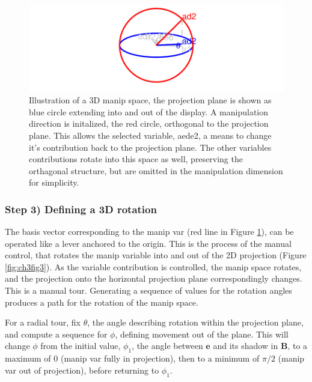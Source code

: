 \documentclass{monashthesis}
\begin{document}
\begin{figure}

{\centering \includegraphics[width=1\linewidth,]{./figures_from_script/ch3_fig2_manip_sp} 

}

\caption{Illustration of a 3D manip space, the projection plane is shown as blue circle extending into and out of the display. A manipulation direction is initalized, the red circle, orthogonal to the projection plane. This allows the selected variable, aede2, a means to change it's contribution back to the projection plane. The other variables contributions rotate into this space as well, preserving the orthagonal structure, but are omitted in the manipulation dimension for simplicity.}\label{fig:ch3fig2}
\end{figure}

\hypertarget{step-3-defining-a-3d-rotation}{%
\subsubsection{Step 3) Defining a 3D rotation}\label{step-3-defining-a-3d-rotation}}

The basis vector corresponding to the manip var (red line in Figure \ref{fig:ch3fig2}), can be operated like a lever anchored to the origin. This is the process of the manual control, that rotates the manip variable into and out of the 2D projection (Figure \ref{fig:ch3fig3}). As the variable contribution is controlled, the manip space rotates, and the projection onto the horizontal projection plane correspondingly changes. This is a manual tour. Generating a sequence of values for the rotation angles produces a path for the rotation of the manip space.

For a radial tour, fix \(\theta\), the angle describing rotation within the projection plane, and compute a sequence for \(\phi\), defining movement out of the plane. This will change \(\phi\) from the initial value, \(\phi_1\), the angle between \(\textbf{e}\) and its shadow in \(\textbf{B}\), to a maximum of \(0\) (manip var fully in projection), then to a minimum of \(\pi/2\) (manip var out of projection), before returning to \(\phi_1\).
\end{document}

